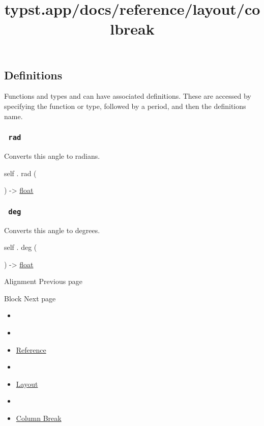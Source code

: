 \subsection{\texorpdfstring{{ Definitions
}}{ Definitions }}\label{definitions}

\label{definitions-tooltip}
Functions and types and can have associated definitions. These are
accessed by specifying the function or type, followed by a period, and
then the definition\textquotesingle s name.

\subsubsection{\texorpdfstring{\texttt{\ rad\ }}{ rad }}\label{definitions-rad}

Converts this angle to radians.

self { . } { rad } (

) -\textgreater{} \href{/docs/reference/foundations/float/}{float}

\subsubsection{\texorpdfstring{\texttt{\ deg\ }}{ deg }}\label{definitions-deg}

Converts this angle to degrees.

self { . } { deg } (

) -\textgreater{} \href{/docs/reference/foundations/float/}{float}

\href{/docs/reference/layout/alignment/}{\pandocbounded{}}

{ Alignment } { Previous page }

\href{/docs/reference/layout/block/}{\pandocbounded{}}

{ Block } { Next page }


\title{typst.app/docs/reference/layout/colbreak}

\begin{itemize}
\tightlist
\item
  \href{/docs}{}
\item
  
\item
  \href{/docs/reference/}{Reference}
\item
  
\item
  \href{/docs/reference/layout/}{Layout}
\item
  
\item
  \href{/docs/reference/layout/colbreak/}{Column Break}
\end{itemize}

